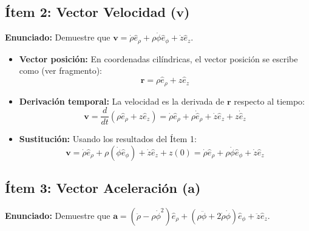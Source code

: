 \documentclass[a4paper]{article}
\begin{document}
\subsection*{Ítem 2: Vector Velocidad ($\mathbf{v}$)}
\textbf{Enunciado:} Demuestre que $\mathbf{v} = \dot{\rho}\hat{e}_\rho + \rho\dot{\phi}\hat{e}_\phi + \dot{z}\hat{e}_z$.

\begin{itemize}
    \item \textbf{Vector posición:} En coordenadas cilíndricas, el vector posición se escribe como (ver fragmento):
    \begin{equation*}
        \mathbf{r} = \rho \hat{e}_\rho + z \hat{e}_z
    \end{equation*}
    
    \item \textbf{Derivación temporal:} La velocidad es la derivada de $\mathbf{r}$ respecto al tiempo:
    \begin{equation*}
        \mathbf{v} = \frac{d}{dt}(\rho \hat{e}_\rho + z \hat{e}_z) = \dot{\rho} \hat{e}_\rho + \rho \dot{\hat{e}}_\rho + \dot{z} \hat{e}_z + z \dot{\hat{e}}_z
    \end{equation*}
    
    \item \textbf{Sustitución:} Usando los resultados del Ítem 1:
    \begin{equation*}
        \mathbf{v} = \dot{\rho} \hat{e}_\rho + \rho (\dot{\phi} \hat{e}_\phi) + \dot{z} \hat{e}_z + z(0) = \dot{\rho} \hat{e}_\rho + \rho \dot{\phi} \hat{e}_\phi + \dot{z} \hat{e}_z \text{}
    \end{equation*}
\end{itemize}

\subsection*{Ítem 3: Vector Aceleración ($\mathbf{a}$)}
\textbf{Enunciado:} Demuestre que $\mathbf{a} = (\ddot{\rho} - \rho\dot{\phi}^2)\hat{e}_\rho + (\rho\ddot{\phi} + 2\dot{\rho}\dot{\phi})\hat{e}_\phi + \ddot{z}\hat{e}_z$.
\end{document}
